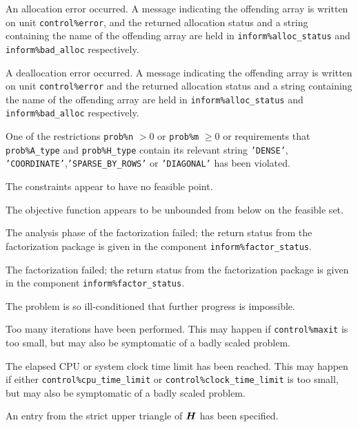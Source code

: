 \documentclass{galahad}
\begin{document}
\begin{description}

 An allocation error occurred. 
A message indicating the offending 
array is written on unit {\tt control\%error}, and the returned allocation 
status and a string containing the name of the offending array
are held in {\tt inform\%alloc\_\-status}
and {\tt inform\%bad\_alloc} respectively.

 A deallocation error occurred. 
A message indicating the offending 
array is written on unit {\tt control\%error} and the returned allocation 
status and a string containing the name of the offending array
are held in {\tt inform\%alloc\_\-status}
and {\tt inform\%bad\_alloc} respectively.

 One of the restrictions 
    {\tt prob\%n} $> 0$ or {\tt prob\%m} $\geq  0$
    or requirements that {\tt prob\%A\_type} 
    and {\tt prob\%H\_type} contain its relevant string
    {\tt 'DENSE'}, {\tt 'COORDINATE'},{\tt 'SPARSE\_BY\_ROWS'} 
    or {\tt 'DIAGONAL'}
    has been violated.


 The constraints appear to have no feasible point.

   The objective function appears to be unbounded from below on the
    feasible set.

 The analysis phase of the factorization failed; 
 the return status from the factorization
    package is given in the component {\tt inform\%fac\-t\-or\_status}.

   The factorization failed; the return status from the factorization
    package is given in the component {\tt inform\%fac\-t\-or\_status}.

 The problem is so ill-conditioned that 
  further progress is impossible.

    Too many iterations have been performed. This may happen if
    {\tt control\%maxit} is too small, but may also be symptomatic of 
    a badly scaled problem.

 The elapsed CPU or system clock time limit has been 
    reached. This may happen if either {\tt control\%cpu\_time\_limit} or
    {\tt control\%clock\_time\_limit} is too small, but may also be symptomatic 
    of a badly scaled problem.

 An entry from the strict upper triangle of ${\bm{H}}$ 
 has been specified.

\end{description}
\end{document}
